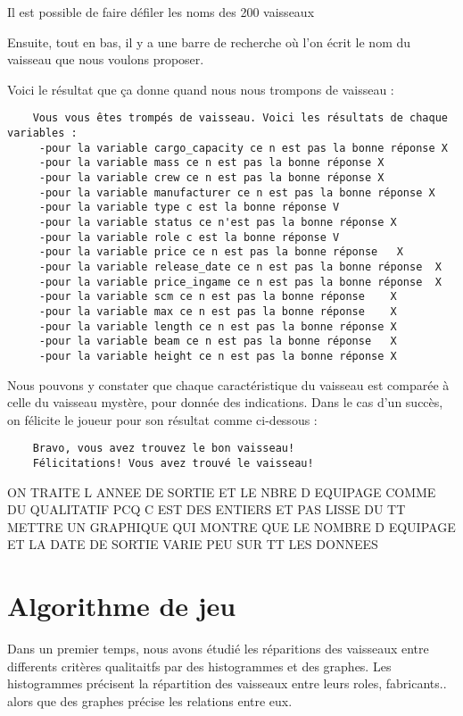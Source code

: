 \documentclass{article}
\begin{document}
Il est possible de faire défiler les noms des 200 vaisseaux

Ensuite, tout en bas, il y a une barre de recherche où l'on écrit le nom du vaisseau que nous voulons 
proposer. 

Voici le résultat que ça donne quand nous nous trompons de vaisseau :

\begin{verbatim}
    Vous vous êtes trompés de vaisseau. Voici les résultats de chaque variables :
     -pour la variable cargo_capacity ce n est pas la bonne réponse X
     -pour la variable mass ce n est pas la bonne réponse X
     -pour la variable crew ce n est pas la bonne réponse X
     -pour la variable manufacturer ce n est pas la bonne réponse X
     -pour la variable type c est la bonne réponse V
     -pour la variable status ce n'est pas la bonne réponse X
     -pour la variable role c est la bonne réponse V
     -pour la variable price ce n est pas la bonne réponse   X
     -pour la variable release_date ce n est pas la bonne réponse  X
     -pour la variable price_ingame ce n est pas la bonne réponse  X
     -pour la variable scm ce n est pas la bonne réponse    X
     -pour la variable max ce n est pas la bonne réponse    X
     -pour la variable length ce n est pas la bonne réponse X
     -pour la variable beam ce n est pas la bonne réponse   X
     -pour la variable height ce n est pas la bonne réponse X

\end{verbatim}

Nous pouvons y constater que chaque caractéristique du vaisseau est comparée à celle du vaisseau mystère, pour donnée des indications.
Dans le cas d'un succès, on félicite le joueur pour son résultat comme ci-dessous : 
\begin{verbatim}
    Bravo, vous avez trouvez le bon vaisseau!
    Félicitations! Vous avez trouvé le vaisseau!    
\end{verbatim}


ON TRAITE L ANNEE DE SORTIE ET LE NBRE D EQUIPAGE COMME DU QUALITATIF PCQ C EST DES ENTIERS ET PAS LISSE DU TT 
METTRE UN GRAPHIQUE QUI MONTRE QUE LE NOMBRE D EQUIPAGE ET LA DATE DE SORTIE VARIE PEU SUR TT LES DONNEES
\section{Algorithme de jeu}

Dans un premier temps, nous avons étudié les réparitions des vaisseaux entre differents critères qualitaitfs
par des histogrammes et des graphes. Les histogrammes précisent la répartition des vaisseaux entre leurs roles, fabricants..
alors que des graphes précise les relations entre eux.
\end{document}
